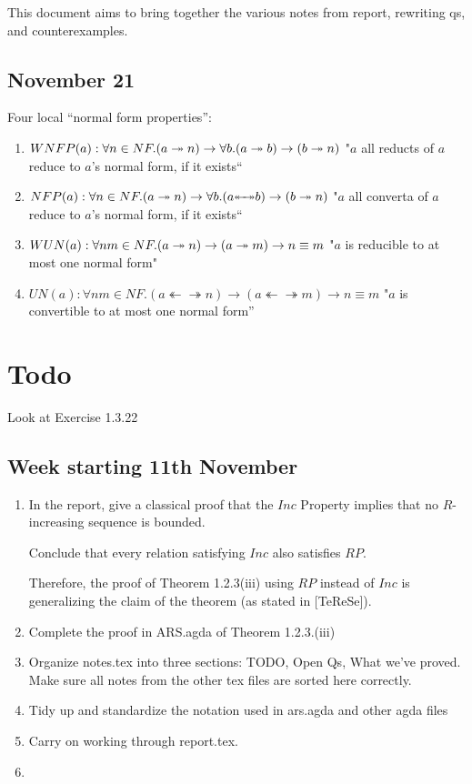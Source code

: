 \documentclass{scrartcl}
\newcommand{\cmark}{\quad\ding{51}}%
\newcommand{\thra}{\twoheadrightarrow}
\newcommand{\thla}{\twoheadleftarrow}
\newcommand{\thlra}{{\thla\!\!\thra}}
\begin{document}
This document aims to bring together the various notes from report, rewriting qs, and counterexamples.

\subsection*{November 21}

Four local ``normal form properties'':
\begin{enumerate}
  \item $WNFP(a) : \forall n \in NF. (a \twoheadrightarrow n) \to \forall b. (a \twoheadrightarrow b) \to (b \twoheadrightarrow n)$
    "$a$ all reducts of $a$ reduce to $a$'s normal form, if it exists``
  \item $NFP(a) : \forall n \in NF. (a \tto n) \to \forall b. (a \thlra b) \to (b \tto n)$
    "$a$ all converta of $a$ reduce to $a$'s normal form, if it exists``
  \item $WUN(a) : \forall n m \in NF. (a \twoheadrightarrow n) \to (a \twoheadrightarrow m) \to n \equiv m$
    "$a$ is reducible to at most one normal form"
  \item $UN(a) : \forall n m \in NF. (a \thlra n) \to (a \thlra m) \to n \equiv m$
    "$a$ is convertible to at most one normal form''
\end{enumerate}

\section{Todo}

Look at Exercise 1.3.22

\subsection*{Week starting 11th November}
\begin{enumerate}
  \item[\cmark] In the report, give a classical proof that the $Inc$ Property
  implies that no $R$-increasing sequence is bounded.

  Conclude that every relation satisfying $Inc$ also satisfies $RP$.

  Therefore, the proof of Theorem 1.2.3(iii) using $RP$ instead of $Inc$
  is generalizing the claim of the theorem (as stated in [TeReSe]).
  \item Complete the proof in ARS.agda of Theorem 1.2.3.(iii)
  \item Organize notes.tex into three sections: TODO, Open Qs, What we've proved. Make sure all notes from the other
  tex files are sorted here correctly.
  \item Tidy up and standardize the notation used in ars.agda and other agda files
  \item Carry on working through report.tex.
  \item
\end{enumerate}
\end{document}
